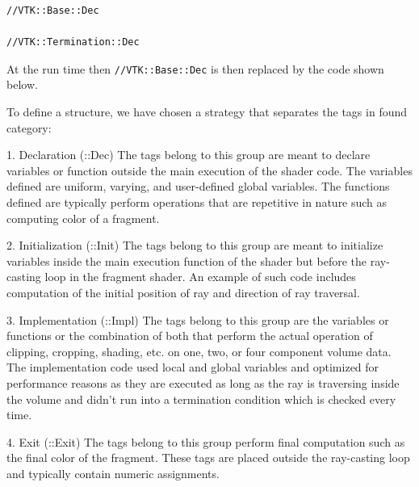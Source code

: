 \begin{lstlisting}
//VTK::Base::Dec

//VTK::Termination::Dec 
\end{lstlisting}

At the run time then \texttt{//VTK::Base::Dec} is then replaced by the code
shown below. 

To define a structure, we have chosen a strategy that separates the tags in
found category: 

1. Declaration (::Dec)
The tags belong to this group are meant to declare variables or function outside
the main execution of the shader code. The variables defined are uniform,
varying, and user-defined global variables. The functions defined are typically
perform operations that are repetitive in nature such as computing color of a
fragment. 

2. Initialization (::Init)
The tags belong to this group are meant to initialize variables inside the main
execution function of the shader but before the ray-casting loop in the fragment
shader. An example of such code includes computation of the initial position of
ray and direction of ray traversal.

3. Implementation (::Impl) The tags belong to this group are the variables or
functions or the combination of both that perform the actual operation of
clipping, cropping, shading, etc. on one, two, or four component volume data.
The implementation code used local and global variables and optimized for
performance reasons as they are executed as long as the ray is traversing inside
the volume and didn't run into a termination condition which is checked every
time.  

4. Exit (::Exit) The tags belong to this group perform final computation such as
the final color of the fragment. These tags are placed outside the ray-casting
loop and typically contain numeric assignments.

